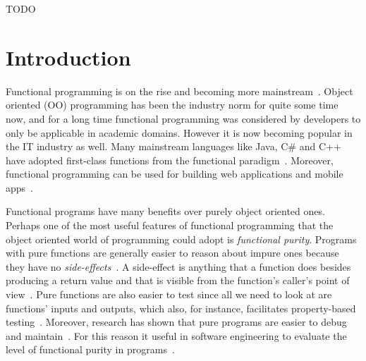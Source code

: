 \documentclass[a4paper,12pt]{article}
\begin{document}
\begin{sammanfattning}
  TODO
\end{sammanfattning}

\tableofcontents


\cleardoublepage

\mainmatter

\section{Introduction} \label{sec:Introduction}

Functional programming is on the rise and becoming more mainstream~\cite{intertech}. Object oriented (OO) programming has been the industry norm for quite some time now, and for a long time functional programming was considered by developers to only be applicable in academic domains. However it is now becoming popular in the IT industry as well. Many mainstream languages like Java, C\# and C++ have adopted first-class functions from the functional paradigm~\cite{intertech}. Moreover, functional programming can be used for building web applications and mobile apps~\cite{jonas-walter}.

Functional programs have many benefits over purely object oriented ones. Perhaps one of the most useful features of functional programming that the object oriented world of programming could adopt is \textit{functional purity}. Programs with pure functions are generally easier to reason about impure ones because they have no \textit{side-effects}~\cite{alvin-alexander}. A side-effect is anything that a function does besides producing a return value and that is visible from the function's caller's point of view~\cite{purity-in-javascript}. Pure functions are also easier to test since all we need to look at are functions' inputs and outputs, which also, for instance, facilitates property-based testing~\cite{alvin-alexander}. Moreover, research has shown that pure programs are easier to debug and maintain~\cite{purity-in-javascript}. %
For this reason it useful in software engineering to evaluate the level of functional purity in programs~\cite{purity-in-javascript}.
\end{document}
